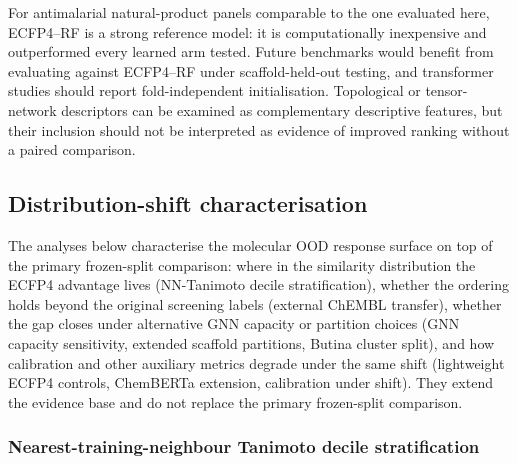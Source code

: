 \documentclass[11pt,a4paper]{article}
\begin{document}
For antimalarial natural-product panels comparable to the one evaluated here, ECFP4--RF is a strong reference model: it is computationally inexpensive and outperformed every learned arm tested. Future benchmarks would benefit from evaluating against ECFP4--RF under scaffold-held-out testing, and transformer studies should report fold-independent initialisation. Topological or tensor-network descriptors can be examined as complementary descriptive features, but their inclusion should not be interpreted as evidence of improved ranking without a paired comparison.

\subsection{Distribution-shift characterisation}

The analyses below characterise the molecular OOD response surface on top of the primary frozen-split comparison: where in the similarity distribution the ECFP4 advantage lives (NN-Tanimoto decile stratification), whether the ordering holds beyond the original screening labels (external ChEMBL transfer), whether the gap closes under alternative GNN capacity or partition choices (GNN capacity sensitivity, extended scaffold partitions, Butina cluster split), and how calibration and other auxiliary metrics degrade under the same shift (lightweight ECFP4 controls, ChemBERTa extension, calibration under shift). They extend the evidence base and do not replace the primary frozen-split comparison.

\subsubsection{Nearest-training-neighbour Tanimoto decile stratification}
\label{sec:nn-deciles-ref}
\end{document}
